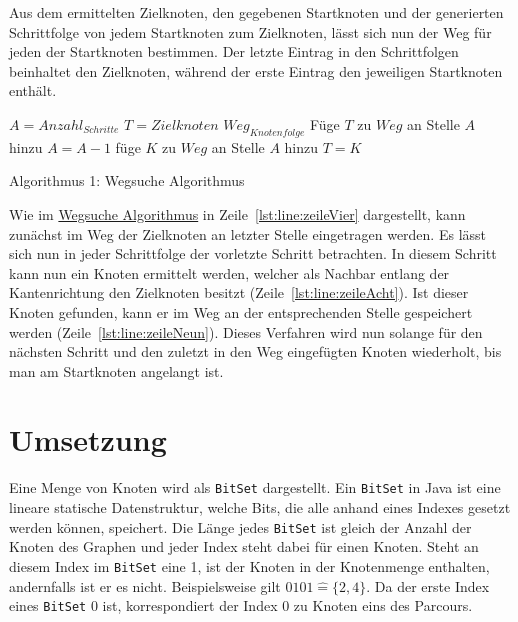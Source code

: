\documentclass[a4paper,10pt,ngerman]{scrartcl}
\begin{document}
    Aus dem ermittelten Zielknoten, den gegebenen Startknoten und der generierten Schrittfolge von jedem Startknoten zum Zielknoten,
    lässt sich nun der Weg für jeden der Startknoten bestimmen.
    Der letzte Eintrag in den Schrittfolgen beinhaltet den Zielknoten,
    während der erste Eintrag den jeweiligen Startknoten enthält.

    \begin{algorithm}
        \begin{algorithmic}[1]
            \State $A = Anzahl_{Schritte}$
            \State $T = Zielknoten$
            \State $Weg_{Knotenfolge}$
            \State Füge $T$ zu $Weg$ an Stelle $A$ hinzu \label{lst:line:zeileVier}
                \State $A = A -1$
                        \label{lst:line:zeileAcht}
                        \State füge $K$ zu $Weg$ an Stelle $A$ hinzu \label{lst:line:zeileNeun}
                        \State $T = K$
                    \EndIf
                \EndFor
            \EndFor
        \end{algorithmic}
        \caption{Algorithmus 1: Wegsuche Algorithmus}
        \label{alg:Algorithm1}
    \end{algorithm}

    Wie im \hyperref[alg:Algorithm1]{Wegsuche Algorithmus} in Zeile~\ref{lst:line:zeileVier} dargestellt,
    kann zunächst im Weg der Zielknoten an letzter Stelle eingetragen werden.
    Es lässt sich nun in jeder Schrittfolge der vorletzte Schritt betrachten.
    In diesem Schritt kann nun ein Knoten ermittelt werden,
    welcher als Nachbar entlang der Kantenrichtung den Zielknoten besitzt (Zeile~\ref{lst:line:zeileAcht}).
    Ist dieser Knoten gefunden,
    kann er im Weg an der entsprechenden Stelle gespeichert werden (Zeile~\ref{lst:line:zeileNeun}).
    Dieses Verfahren wird nun solange für den nächsten Schritt und den zuletzt in den Weg eingefügten Knoten wiederholt,
    bis man am Startknoten angelangt ist.


    \section{Umsetzung}\label{sec:umsetzung}

    Eine Menge von Knoten wird als \texttt{BitSet} dargestellt.
    Ein \texttt{BitSet} in Java ist eine lineare statische Datenstruktur,
    welche Bits, die alle anhand eines Indexes gesetzt werden können,
    speichert.
    Die Länge jedes \texttt{BitSet} ist gleich der Anzahl der Knoten des Graphen
    und jeder Index steht dabei für einen Knoten.
    Steht an diesem Index im \texttt{BitSet} eine 1,
    ist der Knoten in der Knotenmenge enthalten,
    andernfalls ist er es nicht.
    Beispielsweise gilt $0101 \widehat{=} \{2, 4\}$.
    Da der erste Index eines \texttt{BitSet} 0 ist,
    korrespondiert der Index 0 zu Knoten eins des Parcours.
\end{document}
